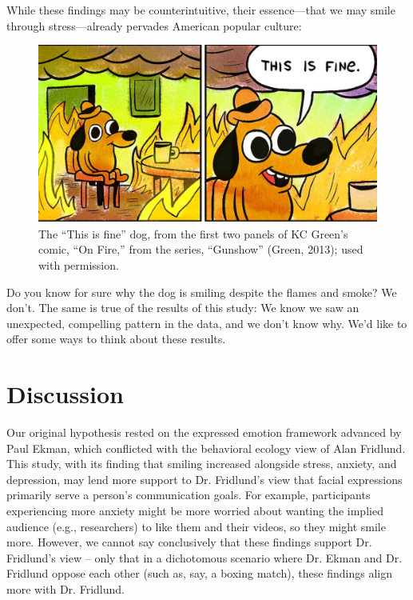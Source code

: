 \documentclass[authordate, empirical,issue]{jote-new-article}
\begin{document}
While these findings may be counterintuitive, their essence—that we may smile through stress—already pervades American popular culture:







\begin{figure}[h]
  \includegraphics[width=\linewidth]{media/image5.jpeg}

  \caption{The “This is fine” dog, from the first two panels of KC Green's comic, “On Fire,” from the series, “Gunshow” (Green, 2013); used with permission.}

  \label{fig:rId12}


\end{figure}










Do you know for sure why the dog is smiling despite the flames and smoke? We don't. The same is true of the results of this study: We know we saw an unexpected, compelling pattern in the data, and we don't know why. We'd like to offer some ways to think about these results.







\section{Discussion}







Our original hypothesis rested on the expressed emotion framework advanced by Paul Ekman, which conflicted with the behavioral ecology view of Alan Fridlund. This study, with its finding that smiling increased alongside stress, anxiety, and depression, may lend more support to Dr. Fridlund's view that facial expressions primarily serve a person's communication goals. For example, participants experiencing more anxiety might be more worried about wanting the implied audience (e.g., researchers) to like them and their videos, so they might smile more. However, we cannot say conclusively that these findings support Dr. Fridlund's view -- only that in a dichotomous scenario where Dr. Ekman and Dr. Fridlund oppose each other (such as, say, a boxing match), these findings align more with Dr. Fridlund.
\end{document}
